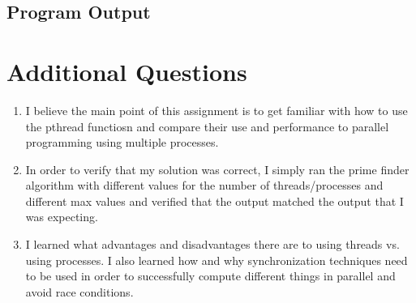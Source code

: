 \documentclass{article}
\begin{document}
\subsection{Program Output}
\begingroup
\obeylines

\endgroup

\section{Additional Questions}
\begin{enumerate}
\item I believe the main point of this assignment is to get familiar with how to use the pthread functiosn and compare their use and performance to parallel programming using multiple processes.
\item In order to verify that my solution was correct, I simply ran the prime finder algorithm with different values for the number of threads/processes and different max values and verified that the output matched the output that I was expecting.
\item I learned what advantages and disadvantages there are to using threads vs. using processes.  I also learned how and why synchronization techniques need to be used in order to successfully compute different things in parallel and avoid race conditions.
\end{enumerate}
\end{document}
